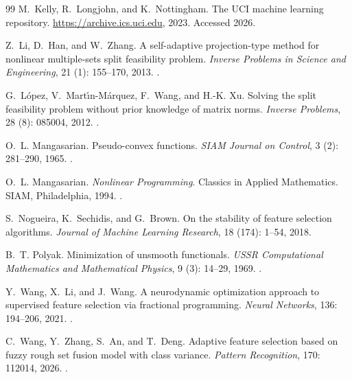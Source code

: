 \begin{thebibliography}{99}
M.~Kelly, R.~Longjohn, and K.~Nottingham.
\newblock The {UCI} machine learning repository.
\newblock \url{https://archive.ics.uci.edu}, 2023.
\newblock Accessed 2026.

Z.~Li, D.~Han, and W.~Zhang.
\newblock A self-adaptive projection-type method for nonlinear multiple-sets split feasibility problem.
\newblock \emph{Inverse Problems in Science and Engineering}, 21 (1): 155--170, 2013.
\newblock {}.

G.~L{\'o}pez, V.~Mart{\'\i}n-M{\'a}rquez, F.~Wang, and H.-K. Xu.
\newblock Solving the split feasibility problem without prior knowledge of matrix norms.
\newblock \emph{Inverse Problems}, 28 (8): 085004, 2012.
\newblock {}.

O.~L. Mangasarian.
\newblock Pseudo-convex functions.
\newblock \emph{SIAM Journal on Control}, 3 (2): 281--290, 1965.
\newblock {}.

O.~L. Mangasarian.
\newblock \emph{Nonlinear Programming}.
\newblock Classics in Applied Mathematics. SIAM, Philadelphia, 1994.
\newblock {}.

S.~Nogueira, K.~Sechidis, and G.~Brown.
\newblock On the stability of feature selection algorithms.
\newblock \emph{Journal of Machine Learning Research}, 18 (174): 1--54, 2018.

B.~T. Polyak.
\newblock Minimization of unsmooth functionals.
\newblock \emph{USSR Computational Mathematics and Mathematical Physics}, 9 (3): 14--29, 1969.
\newblock {}.

Y.~Wang, X.~Li, and J.~Wang.
\newblock A neurodynamic optimization approach to supervised feature selection via fractional programming.
\newblock \emph{Neural Networks}, 136: 194--206, 2021.
\newblock {}.

C.~Wang, Y.~Zhang, S.~An, and T.~Deng.
\newblock Adaptive feature selection based on fuzzy rough set fusion model with class variance.
\newblock \emph{Pattern Recognition}, 170: 112014, 2026.
\newblock {}.


\end{thebibliography}
